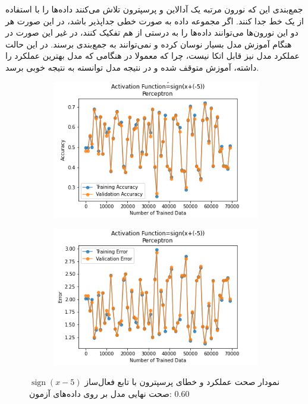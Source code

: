 \documentclass[12pt, a4paper]{article}
\DeclareMathOperator{\sign}{sign}
\begin{document}
جمع‌بندی این که نورون مرتبه یک آدالاین و پرسپترون تلاش می‌کنند داده‌ها را با استفاده از یک خط
جدا کنند. اگر مجموعه داده به صورت خطی جداپذیر باشد، در این صورت هر دو این نورون‌ها می‌توانند
داده‌ها را به درستی از هم تفکیک کنند، در غیر این صورت در هنگام آموزش مدل بسیار نوسان کرده و نمی‌توانند
به جمع‌بندی برسند. در این حالت عملکرد مدل نیز قابل اتکا نیست، چرا که معمولا در هنگامی که مدل بهترین
عملکرد را داشته، آموزش متوقف شده و در نتیجه مدل توانسته به نتیجه خوبی برسد.

\clearpage

\begin{figure}[h]
    \begin{subfigure}{0.45\linewidth}
        \centering
        \includegraphics[width=\linewidth]{images/5/perceptron/activation_func/5.png}
    \end{subfigure}
    \hfil
    \begin{subfigure}{0.45\linewidth}
        \centering
        \includegraphics[width=\linewidth]{images/5/perceptron/activation_func/6.png}
    \end{subfigure}
    \caption{نمودار صحت عملکرد‌ و خطای پرسپترون با تابع فعال‌ساز $\sign(x-5)$
    \newline
    صحت نهایی مدل بر روی داده‌های آزمون: $0.60$}
\end{figure}
\end{document}
